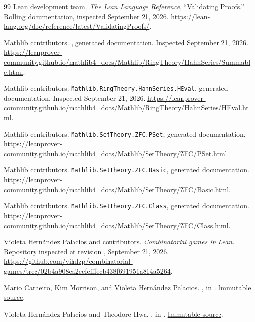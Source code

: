 \documentclass[11pt,letterpaper]{article}
\theoremstyle{definition}
\theoremstyle{remark}
\numberwithin{equation}{section}
\begin{document}
\begin{thebibliography}{99}
Lean development team. \emph{The Lean Language Reference}, ``Validating Proofs.'' Rolling documentation, inspected September 21, 2026.
\url{https://lean-lang.org/doc/reference/latest/ValidatingProofs/}.

Mathlib contributors. , generated documentation. Inspected September 21, 2026.
\url{https://leanprover-community.github.io/mathlib4_docs/Mathlib/RingTheory/HahnSeries/Summable.html}.

Mathlib contributors. \texttt{Mathlib.RingTheory.HahnSeries.HEval}, generated documentation. Inspected September 21, 2026.
\url{https://leanprover-community.github.io/mathlib4_docs/Mathlib/RingTheory/HahnSeries/HEval.html}.

Mathlib contributors. \texttt{Mathlib.SetTheory.ZFC.PSet}, generated documentation.
\url{https://leanprover-community.github.io/mathlib4_docs/Mathlib/SetTheory/ZFC/PSet.html}.

Mathlib contributors. \texttt{Mathlib.SetTheory.ZFC.Basic}, generated documentation.
\url{https://leanprover-community.github.io/mathlib4_docs/Mathlib/SetTheory/ZFC/Basic.html}.

Mathlib contributors. \texttt{Mathlib.SetTheory.ZFC.Class}, generated documentation.
\url{https://leanprover-community.github.io/mathlib4_docs/Mathlib/SetTheory/ZFC/Class.html}.

Violeta Hern\'andez Palacios and contributors. \emph{Combinatorial games in Lean}.
Repository inspected at revision , September 21, 2026.
\url{https://github.com/vihdzp/combinatorial-games/tree/02b4a908ea2ecfefffecb438f691951a814a5264}.

Mario Carneiro, Kim Morrison, and Violeta Hern\'andez Palacios.
, in \cite{GamesRepo}.
\href{https://github.com/vihdzp/combinatorial-games/blob/02b4a908ea2ecfefffecb438f691951a814a5264/CombinatorialGames/Surreal/Basic.lean}{Immutable source}.

Violeta Hern\'andez Palacios and Theodore Hwa.
, in \cite{GamesRepo}.
\href{https://github.com/vihdzp/combinatorial-games/blob/02b4a908ea2ecfefffecb438f691951a814a5264/CombinatorialGames/Surreal/Division.lean}{Immutable source}.


\end{thebibliography}
\end{document}

